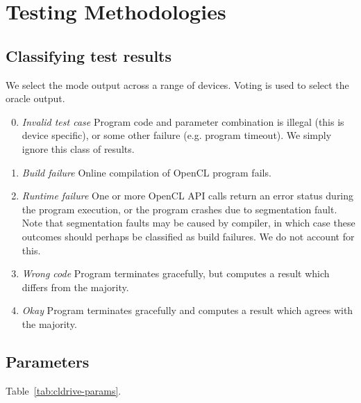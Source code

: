 \section{Testing Methodologies}\label{sec:methodology}


\subsection{Classifying test results}

We select the mode output across a range of devices. Voting is used to select the oracle output.
%
\begin{enumerate}
	\setcounter{enumi}{-1}
	\item \emph{Invalid test case} Program code and parameter combination is illegal (this is device specific), or some other failure (e.g. program timeout). We simply ignore this class of results.
	\item \emph{Build failure} Online compilation of OpenCL program fails.
	\item \emph{Runtime failure} One or more OpenCL API calls return an error status during the program execution, or the program crashes due to segmentation fault. Note that segmentation faults may be caused by compiler, in which case these outcomes should perhaps be classified as build failures. We do not account for this.
	\item \emph{Wrong code} Program terminates gracefully, but computes a result which differs from the majority.
	\item \emph{Okay} Program terminates gracefully and computes a result which agrees with the majority.
\end{enumerate}


\subsection{Parameters}

Table~\ref{tab:cldrive-params}. 
